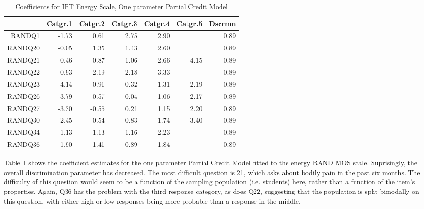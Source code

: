 \documentclass{article}
\begin{document}
\begin{table}[ht]
\centering
\begin{tabular}{rrrrrrr}
  \hline
 & Catgr.1 & Catgr.2 & Catgr.3 & Catgr.4 & Catgr.5 & Dscrmn \\ 
  \hline
RANDQ1 & -1.73 & 0.61 & 2.75 & 2.90 &  & 0.89 \\ 
  RANDQ20 & -0.05 & 1.35 & 1.43 & 2.60 &  & 0.89 \\ 
  RANDQ21 & -0.46 & 0.87 & 1.06 & 2.66 & 4.15 & 0.89 \\ 
  RANDQ22 & 0.93 & 2.19 & 2.18 & 3.33 &  & 0.89 \\ 
  RANDQ23 & -4.14 & -0.91 & 0.32 & 1.31 & 2.19 & 0.89 \\ 
  RANDQ26 & -3.79 & -0.57 & -0.04 & 1.06 & 2.17 & 0.89 \\ 
  RANDQ27 & -3.30 & -0.56 & 0.21 & 1.15 & 2.20 & 0.89 \\ 
  RANDQ30 & -2.45 & 0.54 & 0.83 & 1.74 & 3.40 & 0.89 \\ 
  RANDQ34 & -1.13 & 1.13 & 1.16 & 2.23 &  & 0.89 \\ 
  RANDQ36 & -1.90 & 1.41 & 0.89 & 1.84 &  & 0.89 \\ 
   \hline
\end{tabular}
\caption{Coefficients for IRT Energy Scale, One parameter Partial Credit Model} 
\label{tab:hom1energpcm1pl}
\end{table}
Table \ref{tab:hom1energpcm1pl} shows the coefficient estimates for the one parameter Partial Credit Model fitted to the energy RAND MOS scale. Suprisingly, the overall discrimination parameter has decreased. The most difficult question is 21, which asks about bodily pain in the past six months. The difficulty of this question would seem to be a function of the sampling population (i.e. students) here, rather than a function of the item's properties. Again, Q36 has the problem with the third response category, as does Q22, suggesting that the population is split bimodally on this question, with either high or low responses being more probable than a response in the middle. 
\end{document}
